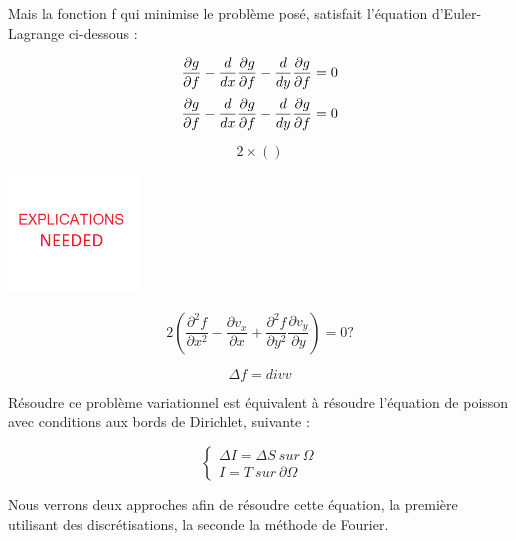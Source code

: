 Mais la fonction f qui minimise le problème posé,  satisfait l'équation d'Euler-Lagrange ci-dessous : 

\begin{equation*}
    \frac{\partial g}{\partial f}-\frac{d}{dx}\frac{\partial g}{\partial f   }-\frac{d}{dy}\frac{\partial g}{\partial f}= 0 \\
\end{equation*}
\begin{equation*}
    \frac{\partial g}{\partial f}-\frac{d}{dx}\frac{\partial g}{\partial f}-\frac{d}{dy}\frac{\partial g}{\partial f}= 0 \\
\end{equation*}

\begin{equation*}
    2\times()
\end{equation*}

\begin{center}
    \includegraphics[width = 100pt]{Images/EXPLICATIONS_needed.png}
\end{center}

\begin{equation*}
    2(\frac{\partial^2 f}{\partial x^2}-\frac{\partial v_x}{\partial x}+\frac{\partial^2 f}{\partial y^2}\frac{\partial v_y}{\partial y}) = 0 ?
\end{equation*}

\begin{equation}
    \Delta f = div v
\end{equation}



Résoudre ce problème variationnel est équivalent à résoudre l'équation de poisson avec conditions aux bords de Dirichlet, suivante :
\begin{center}
    \begin{equation*}
        \left\{
        \begin{aligned}
         \Delta I = \Delta S  \ sur \  \Omega \\
          I = T \ sur \  \partial \Omega
        \end{aligned}
        \right.
    \end{equation*}
\end{center}

Nous verrons deux approches afin de résoudre cette équation, la première utilisant des discrétisations, la seconde la méthode de Fourier. 

